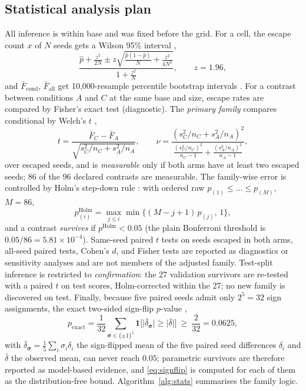 \subsection{Statistical analysis plan}
\label{sec:method:stats}
All inference is within base and was fixed before the grid. For a cell, the escape count $x$ of $N$ seeds gets a Wilson 95\% interval \cite{wilson1927probable},
\begin{equation}
\frac{\hat p+\frac{z^2}{2N}\pm z\sqrt{\frac{\hat p(1-\hat p)}{N}+\frac{z^2}{4N^2}}}{1+\frac{z^2}{N}},\qquad z=1.96,
\label{eq:wilson}
\end{equation}
and $\bar F_{\mathrm{cond}}$, $\bar F_{\mathrm{all}}$ get 10{,}000-resample percentile bootstrap intervals \cite{efron1993bootstrap}. For a contrast between conditions $A$ and $C$ at the same base and size, escape rates are compared by Fisher's exact test (diagnostic). The \emph{primary family} compares conditional \Fone{} by Welch's $t$ \cite{welch1947generalization},
\begin{equation}
t=\frac{\bar F_C-\bar F_A}{\sqrt{s_C^2/n_C+s_A^2/n_A}},\qquad
\nu=\frac{(s_C^2/n_C+s_A^2/n_A)^2}{\frac{(s_C^2/n_C)^2}{n_C-1}+\frac{(s_A^2/n_A)^2}{n_A-1}},
\label{eq:welch}
\end{equation}
over escaped seeds, and is \emph{measurable} only if both arms have at least two escaped seeds; 86 of the 96 declared contrasts are measurable. The family-wise error is controlled by Holm's step-down rule \cite{holm1979simple}: with ordered raw $p_{(1)}\le\dots\le p_{(M)}$, $M=86$,
\begin{equation}
p^{\mathrm{Holm}}_{(i)}=\max_{j\le i}\min\big\{(M-j+1)\,p_{(j)},\,1\big\},
\label{eq:holm}
\end{equation}
and a contrast \emph{survives} if $p^{\mathrm{Holm}}<0.05$ (the plain Bonferroni threshold is $0.05/86=5.81\times10^{-4}$). Same-seed paired $t$ tests on seeds escaped in both arms, all-seed paired tests, Cohen's $d$, and Fisher tests are reported as diagnostics or sensitivity analyses and are not members of the adjusted family. Test-split inference is restricted to \emph{confirmation}: the 27 validation survivors are re-tested with a paired $t$ on test scores, Holm-corrected within the 27; no new family is discovered on test. Finally, because five paired seeds admit only $2^5=32$ sign assignments, the exact two-sided sign-flip $p$-value \cite{good2005permutation},
\begin{equation}
p_{\mathrm{exact}}=\frac{1}{32}\sum_{\bm{\sigma}\in\{\pm1\}^5}\mathbf{1}\Big[\big|\bar\delta_{\bm{\sigma}}\big|\ge\big|\bar\delta\big|\Big]\ \ge\ \frac{2}{32}=0.0625,
\label{eq:signflip}
\end{equation}
with $\bar\delta_{\bm{\sigma}}=\tfrac15\sum_i\sigma_i\delta_i$ the sign-flipped mean of the five paired seed differences $\delta_i$ and $\bar\delta$ the observed mean,
can never reach $0.05$; parametric survivors are therefore reported as model-based evidence, and \eqref{eq:signflip} is computed for each of them as the distribution-free bound. Algorithm~\ref{alg:stats} summarises the family logic.

